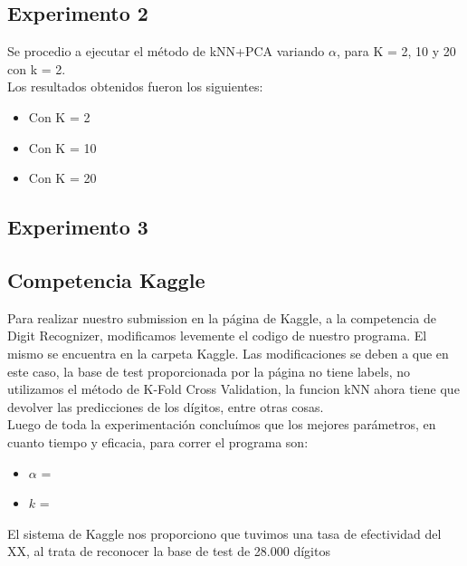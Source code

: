 \subsection{Experimento 2}
Se procedio a ejecutar el método de kNN+PCA variando $\alpha$, para K = 2, 10 y 20 con k = 2.\\ 
Los resultados obtenidos fueron los siguientes:
\begin{itemize}
\item Con K = 2\\

    
\item Con K = 10\\

\item Con K = 20\\
\end{itemize}

\subsection{Experimento 3}


\subsection{Competencia Kaggle}
Para realizar nuestro submission en la página de Kaggle, a la competencia de Digit Recognizer, modificamos levemente el codigo de nuestro programa. El mismo se encuentra en la carpeta Kaggle. Las modificaciones se deben a que en este caso, la base de test proporcionada por la página no tiene labels, no utilizamos el método de K-Fold Cross Validation, la funcion kNN ahora tiene que devolver las predicciones de los dígitos, entre otras cosas.\\
Luego de toda la experimentación concluímos que los mejores parámetros, en cuanto tiempo y eficacia, para correr el programa son:
\begin{itemize}
\item $\alpha$ = 
\item $k$ = 
\end{itemize}

El sistema de Kaggle nos proporciono que tuvimos una tasa de efectividad del XX, al trata de reconocer la base de test de 28.000 dígitos